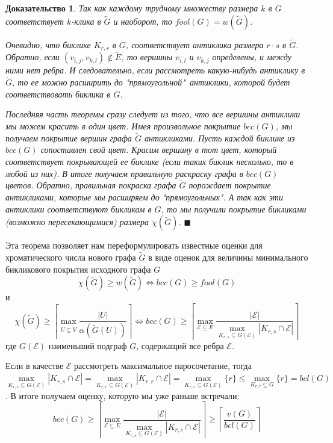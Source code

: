 \documentclass[a4paper]{article}
\newtheorem*{msolution}{Доказательство}
\begin{document}
\begin{msolution}
    Так как каждому трудному множеству размера $k$ в $G$ соответствует $k$-клика в $\widetilde{G}$ и 
    наоборот, то $fool(G) = w(\widetilde{G})$.
    
    Очевидно, что биклике $K_{r,s}$ в $G$, соответствует антиклика размера $r\cdot s$ в $\widetilde{G}$. 
    Обратно, если $(v_{i,j}, v_{k,l}) \notin \widetilde{E}$, то вершины $v_{i, l}$ и $v_{k, j}$ 
    определены, и между ними нет ребра. И следовательно, если рассмотреть какую-нибудь антиклику в 
    $\widetilde{G}$, то ее можно расширить до "прямоугольной"\  антиклики, которой будет соответствовать 
    биклика в $G$.
    
    Последняя часть теоремы сразу следует из того, что все вершины антиклики мы можем красить в один цвет. Имея 
    произвольное покрытие $bcc(G)$, мы получаем покрытие вершин графа $\widetilde{G}$ антикликами. 
    Пусть каждой биклике из $bcc(G)$ сопоставлен свой цвет. Красим вершину в тот цвет, который соответствует 
    покрывающей ее биклике (если таких биклик несколько, то в любой из них). В итоге получаем правильную 
    раскраску графа в $bcc(G)$ цветов. Обратно, правильная покраска графа $\widetilde{G}$ порождает 
    покрытие антикликами, которые мы расширяем до "прямоугольных". А так как эти антиклики
    соответствуют бикликам в $G$, то мы получили покрытие бикликами (возможно пересекающимися) 
    размера $\chi(\widetilde{G})$. $\blacksquare$
\end{msolution}

Эта теорема позволяет нам  переформулировать известные оценки для хроматического числа нового графа 
$\widetilde G$ в виде оценок для величины минимального бикликового покрытия исходного графа $G$
$$ \chi(\widetilde{G}) \geq w(\widetilde{G}) \Longleftrightarrow bcc(G) \geq fool(G)$$
и $$\chi(\widetilde{G}) \geq \left\lceil\max\limits_{U\subseteq \widetilde{V}}\frac{|U|}{\alpha(\widetilde{G}(U))}\right\rceil 
\Longleftrightarrow bcc(G) \geq \left\lceil\max\limits_{\mathcal{E}\subseteq E}\frac{|\mathcal{E}|}
{\max\limits_{K_{r,s}\subseteq G(\mathcal{E})}|K_{r,s}\cap\mathcal{E}|}\right\rceil$$ где $G(\mathcal{E})$ наименьший подграф $G$, 
содержащий все ребра $\mathcal{E}$. 

Если в качестве $\mathcal{E}$ рассмотреть максимальное паросочетание, тогда $\max\limits_{K_{r,s}\subseteq 
G(\mathcal{E})}|K_{r,s}\cap\mathcal{E}| = \max\limits_{K_{r,r}\subseteq G(\mathcal{E})}|K_{r,r}\cap\mathcal{E}| = 
\max\limits_{K_{r,r}\subseteq G(\mathcal{E})}\{r\} \leq \max\limits_{K_{r,r}\subseteq G}\{r\} = bcl(G)$. В итоге 
получаем оценку, которую мы уже раньше встречали: $$bcc(G) \geq \left\lceil\max\limits_{\mathcal{E}\subseteq E}\frac{|\mathcal{E}|}
{\max\limits_{K_{r,s}\subseteq G(\mathcal{E})}|K_{r,s}\cap\mathcal{E}|}\right\rceil  \geq \left\lceil\frac{v(G)}{bcl(G)}\right\rceil$$
\end{document}
